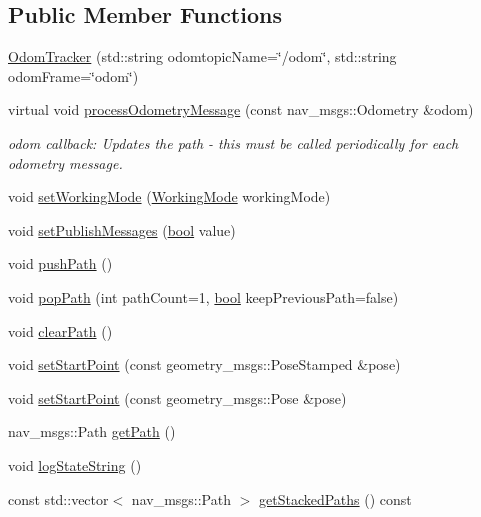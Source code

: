 \subsection*{Public Member Functions}
\begin{DoxyCompactItemize}
\item 
\hyperlink{classcl__move__base__z_1_1odom__tracker_1_1OdomTracker_a99e1f405d0b3ec3e9fc73e666793c409}{Odom\+Tracker} (std\+::string odomtopic\+Name=\char`\"{}/odom\char`\"{}, std\+::string odom\+Frame=\char`\"{}odom\char`\"{})
\item 
virtual void \hyperlink{classcl__move__base__z_1_1odom__tracker_1_1OdomTracker_a12c5a839cfde2e8f2f55a5e0c9647b18}{process\+Odometry\+Message} (const nav\+\_\+msgs\+::\+Odometry \&odom)
\begin{DoxyCompactList}\small\item\em odom callback\+: Updates the path -\/ this must be called periodically for each odometry message. \end{DoxyCompactList}\item 
void \hyperlink{classcl__move__base__z_1_1odom__tracker_1_1OdomTracker_aeed01bdefd9a1cc709b0b3e4eed285ed}{set\+Working\+Mode} (\hyperlink{namespacecl__move__base__z_1_1odom__tracker_ac46b05813b2791604f6cd0a39ace3ef8}{Working\+Mode} working\+Mode)
\item 
void \hyperlink{classcl__move__base__z_1_1odom__tracker_1_1OdomTracker_a3b3cf9010e4e4fe4f96cfafd5a529517}{set\+Publish\+Messages} (\hyperlink{classbool}{bool} value)
\item 
void \hyperlink{classcl__move__base__z_1_1odom__tracker_1_1OdomTracker_a205ee48ec8b4599658e7408fc4755239}{push\+Path} ()
\item 
void \hyperlink{classcl__move__base__z_1_1odom__tracker_1_1OdomTracker_a2749e5cd0443423d50864a0166b078b9}{pop\+Path} (int path\+Count=1, \hyperlink{classbool}{bool} keep\+Previous\+Path=false)
\item 
void \hyperlink{classcl__move__base__z_1_1odom__tracker_1_1OdomTracker_a93a14e15e3e623f530e056f403bf7644}{clear\+Path} ()
\item 
void \hyperlink{classcl__move__base__z_1_1odom__tracker_1_1OdomTracker_a9f4989c6353022c2ec3b0546c09bf3bc}{set\+Start\+Point} (const geometry\+\_\+msgs\+::\+Pose\+Stamped \&pose)
\item 
void \hyperlink{classcl__move__base__z_1_1odom__tracker_1_1OdomTracker_a4aefe72c155bd0d57c9f42b77a8928a6}{set\+Start\+Point} (const geometry\+\_\+msgs\+::\+Pose \&pose)
\item 
nav\+\_\+msgs\+::\+Path \hyperlink{classcl__move__base__z_1_1odom__tracker_1_1OdomTracker_a762bc88653ebb7d78e693ba465fb160f}{get\+Path} ()
\item 
void \hyperlink{classcl__move__base__z_1_1odom__tracker_1_1OdomTracker_a6d0b450474d9d555205ff4281965164e}{log\+State\+String} ()
\item 
const std\+::vector$<$ nav\+\_\+msgs\+::\+Path $>$ \hyperlink{classcl__move__base__z_1_1odom__tracker_1_1OdomTracker_a9d10e6ce0f462a0cf41db7488ea00494}{get\+Stacked\+Paths} () const
\end{DoxyCompactItemize}
